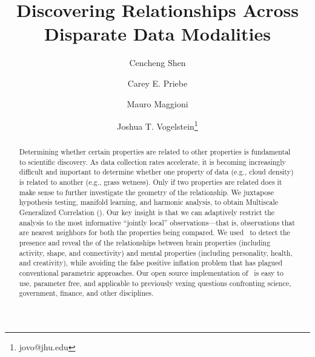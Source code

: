 \documentclass[11pt]{article}
\begin{document}
\def\spacingset#1{\renewcommand{\baselinestretch}%
{#1}\small\normalsize} \spacingset{1}
\title{\vspace{-2em}\bf Discovering  Relationships Across Disparate Data Modalities}

\author[1,2]{Cencheng Shen} %
\author[1,3]{Carey E. Priebe}%
\author[3,4,6]{Mauro Maggioni}%
\author[1,5,6]{Joshua T. Vogelstein\thanks{jovo@jhu.edu}}
\maketitle 
\thispagestyle{empty}
\date{}
\vspace{-15pt}
\begin{abstract}
Determining whether certain properties are related to other properties is fundamental to scientific discovery. As data collection rates accelerate, it is becoming increasingly difficult and important to determine whether one property of data (e.g., cloud density) is related to another (e.g., grass wetness). Only if two properties are related does it make sense to further investigate the geometry of the relationship. 
We juxtapose hypothesis testing, manifold learning, and harmonic analysis, to obtain Multiscale Generalized Correlation (\Mgc). 
Our key insight is that we can adaptively restrict the analysis to the most informative ``jointly local'' observations---that is, observations that are nearest neighbors for both the properties being compared. 
We used \Mgc~to detect the presence and reveal the  of the relationships between brain properties (including activity, shape, and connectivity) and mental properties (including personality, health, and creativity), while avoiding  the false positive inflation problem that has plagued conventional parametric approaches. 
Our open source implementation of \Mgc~is easy to use, parameter free, and applicable to previously vexing questions confronting science, government, finance, and other disciplines. 
\end{abstract}
\end{document}
